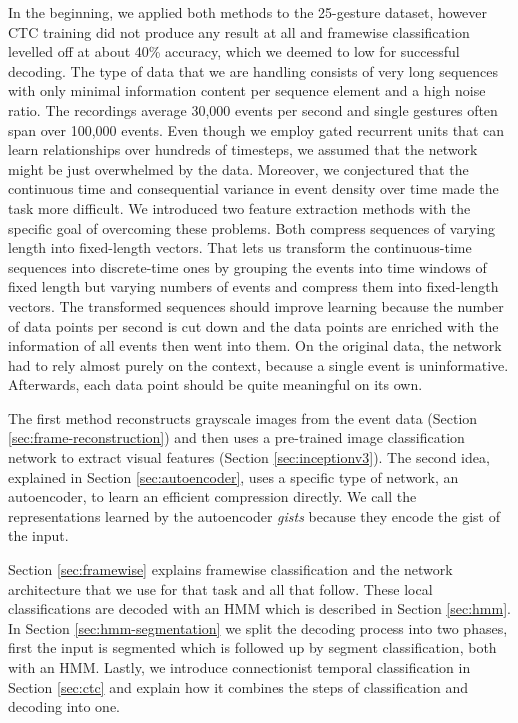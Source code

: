 In the beginning, we applied both methods to the 25-gesture dataset, however CTC
training did not produce any result at all and framewise classification levelled
off at about 40\% accuracy, which we deemed to low for successful decoding. The
type of data that we are handling consists of very long sequences with only
minimal information content per sequence element and a high noise ratio. The
recordings average 30,000 events per second and single gestures often span over
100,000 events. Even though we employ gated recurrent units that can learn
relationships over hundreds of timesteps, we assumed that the network might be
just overwhelmed by the data. Moreover, we conjectured that the continuous time
and consequential variance in event density over time made the task more
difficult. We introduced two feature extraction methods with the specific goal
of overcoming these problems. Both compress sequences of varying length into
fixed-length vectors. That lets us transform the continuous-time sequences into
discrete-time ones by grouping the events into time windows of fixed length but
varying numbers of events and compress them into fixed-length vectors. The
transformed sequences should improve learning because the number of data points
per second is cut down and the data points are enriched with the information of
all events then went into them. On the original data, the network had to rely
almost purely on the context, because a single event is uninformative.
Afterwards, each data point should be quite meaningful on its own.


The first method reconstructs grayscale images from the event data (Section
\ref{sec:frame-reconstruction}) and then uses a pre-trained image classification
network to extract visual features (Section \ref{sec:inceptionv3}). The second
idea, explained in Section \ref{sec:autoencoder}, uses a specific type of
network, an autoencoder, to learn an efficient compression directly. We call the
representations learned by the autoencoder \emph{gists} because they encode the
gist of the input.

Section \ref{sec:framewise} explains framewise classification and the network
architecture that we use for that task and all that follow. These local
classifications are decoded with an HMM which is described in Section
\ref{sec:hmm}. In Section \ref{sec:hmm-segmentation} we split the decoding
process into two phases, first the input is segmented which is followed up by
segment classification, both with an HMM. Lastly, we introduce connectionist
temporal classification in Section \ref{sec:ctc} and explain how it combines the
steps of classification and decoding into one.

